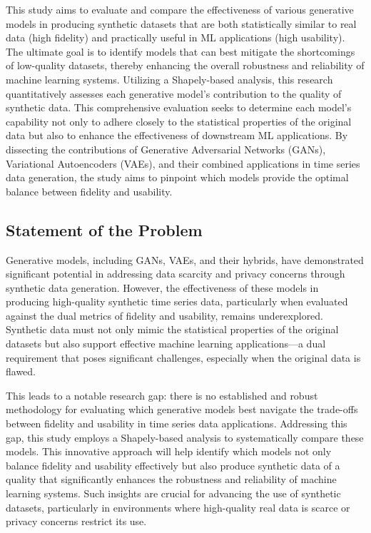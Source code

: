 \documentclass{article}
\begin{document}
This study aims to evaluate and compare the effectiveness of various generative models in producing synthetic datasets that are both statistically similar to real data (high fidelity) and practically useful in ML applications (high usability). The ultimate goal is to identify models that can best mitigate the shortcomings of low-quality datasets, thereby enhancing the overall robustness and reliability of machine learning systems. Utilizing a Shapely-based analysis, this research quantitatively assesses each generative model’s contribution to the quality of synthetic data. This comprehensive evaluation seeks to determine each model’s capability not only to adhere closely to the statistical properties of the original data but also to enhance the effectiveness of downstream ML applications. By dissecting the contributions of Generative Adversarial Networks (GANs), Variational Autoencoders (VAEs), and their combined applications in time series data generation, the study aims to pinpoint which models provide the optimal balance between fidelity and usability.

\subsection{Statement of the Problem}
Generative models, including GANs, VAEs, and their hybrids, have demonstrated significant potential in addressing data scarcity and privacy concerns through synthetic data generation. However, the effectiveness of these models in producing high-quality synthetic time series data, particularly when evaluated against the dual metrics of fidelity and usability, remains underexplored. Synthetic data must not only mimic the statistical properties of the original datasets but also support effective machine learning applications—a dual requirement that poses significant challenges, especially when the original data is flawed.

This leads to a notable research gap: there is no established and robust methodology for evaluating which generative models best navigate the trade-offs between fidelity and usability in time series data applications. Addressing this gap, this study employs a Shapely-based analysis to systematically compare these models. This innovative approach will help identify which models not only balance fidelity and usability effectively but also produce synthetic data of a quality that significantly enhances the robustness and reliability of machine learning systems. Such insights are crucial for advancing the use of synthetic datasets, particularly in environments where high-quality real data is scarce or privacy concerns restrict its use.
\end{document}
